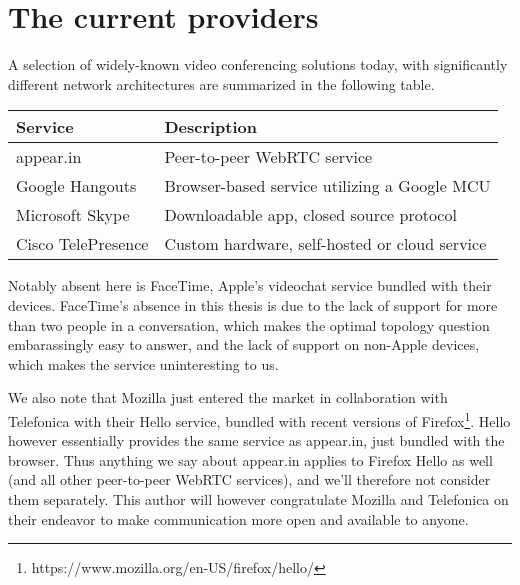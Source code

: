 


\section{The current providers}

A selection of widely-known video conferencing solutions today, with significantly different network architectures are summarized in the following table.

\begin{center}
	\label{tab:existing-solutions}
	\begin{tabular}{| l | l |}
		\hline
		\textbf{Service} & \textbf{Description} \\ \hline
		appear.in & Peer-to-peer WebRTC service \\ \hline
		Google Hangouts & Browser-based service utilizing a Google MCU \\ \hline
		Microsoft Skype & Downloadable app, closed source protocol \\ \hline
		Cisco TelePresence & Custom hardware, self-hosted or cloud service \\ \hline
	\end{tabular}
\end{center}

Notably absent here is FaceTime, Apple's videochat service bundled with their devices. FaceTime's absence in this thesis is due to the lack of support for more than two people in a conversation, which makes the optimal topology question embarassingly easy to answer, and the lack of support on non-Apple devices, which makes the service uninteresting to us.

We also note that Mozilla just entered the market in collaboration with Telefonica with their Hello service, bundled with recent versions of Firefox\footnote{https://www.mozilla.org/en-US/firefox/hello/}. Hello however essentially provides the same service as appear.in, just bundled with the browser. Thus anything we say about appear.in applies to Firefox Hello as well (and all other peer-to-peer WebRTC services), and we'll therefore not consider them separately. This author will however congratulate Mozilla and Telefonica on their endeavor to make communication more open and available to anyone.

